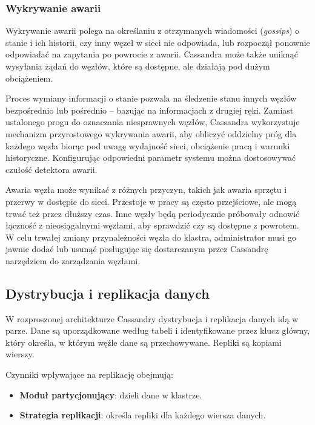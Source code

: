 \subsubsection{Wykrywanie awarii}

Wykrywanie awarii polega na określaniu z otrzymanych wiadomości (\textit{gossips}) o stanie i ich historii, czy inny węzeł w sieci nie odpowiada, lub rozpoczął ponownie odpowiadać na zapytania po powrocie z awarii.
Cassandra może także uniknąć wysyłania żądań do węzłów, które są dostępne, ale działają pod dużym obciążeniem.

Proces wymiany informacji o stanie pozwala na śledzenie stanu innych węzłów bezpośrednio lub pośrednio -- bazując na informacjach z drugiej ręki.
Zamiast ustalonego progu do oznaczania niesprawnych węzłów, Cassandra wykorzystuje mechanizm przyrostowego wykrywania awarii, aby obliczyć oddzielny próg dla każdego węzła biorąc pod uwagę wydajność sieci, obciążenie pracą i warunki historyczne.
Konfigurując odpowiedni parametr systemu można dostosowywać czułość detektora awarii.

Awaria węzła może wynikać z różnych przyczyn, takich jak awaria sprzętu i przerwy w dostępie do sieci.
Przestoje w pracy są często przejściowe, ale mogą trwać też przez dłuższy czas.
Inne węzły będą periodycznie próbowały odnowić łączność z nieosiągalnymi węzłami, aby sprawdzić czy są dostępne z powrotem.
W celu trwałej zmiany przynależności węzła do klastra, administrator musi go jawnie dodać lub usunąć posługując się dostarczanym przez Cassandrę narzędziem do zarządzania węzłami.

\subsection{Dystrybucja i replikacja danych}

W rozproszonej architekturze Cassandry dystrybucja i replikacja danych idą w parze.
Dane są uporządkowane według tabeli i identyfikowane przez klucz główny, który określa, w którym węźle dane są przechowywane.
Repliki są kopiami wierszy.

Czynniki wpływające na replikację obejmują: 
\begin{itemize}
    \item \textbf{Moduł partycjonujący}: dzieli dane w klastrze.
    \item \textbf{Strategia replikacji}: określa repliki dla każdego wiersza danych.
\end{itemize}

